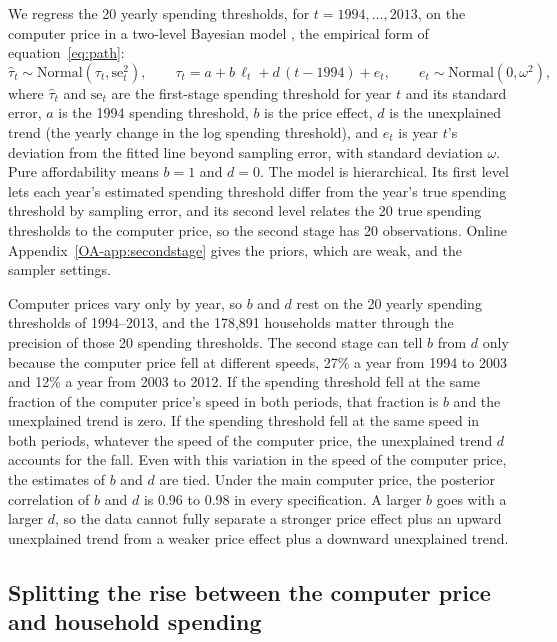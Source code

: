 \documentclass[11pt]{article}
\begin{document}
We regress the 20 yearly spending thresholds, for $t = 1994, \dots, 2013$, on the computer price in a two-level Bayesian model \citep{lewis2005}, the empirical form of equation~\eqref{eq:path}:
\begin{equation}
\hat\tau_t \sim \text{Normal}(\tau_t, \text{se}_t^2), \qquad
\tau_t = a + b\,\ell_t + d\,(t - 1994) + e_t, \qquad e_t \sim \text{Normal}(0, \omega^2),
\end{equation}
where $\hat\tau_t$ and $\text{se}_t$ are the first-stage spending threshold for year $t$ and its standard error, $a$ is the 1994 spending threshold, $b$ is the price effect, $d$ is the unexplained trend (the yearly change in the log spending threshold), and $e_t$ is year $t$'s deviation from the fitted line beyond sampling error, with standard deviation $\omega$. Pure affordability means $b = 1$ and $d = 0$. The model is hierarchical. Its first level lets each year's estimated spending threshold differ from the year's true spending threshold by sampling error, and its second level relates the 20 true spending thresholds to the computer price, so the second stage has 20 observations. Online Appendix~\ref{OA-app:secondstage} gives the priors, which are weak, and the sampler settings.

Computer prices vary only by year, so $b$ and $d$ rest on the 20 yearly spending thresholds of 1994--2013, and the 178{,}891 households matter through the precision of those 20 spending thresholds. The second stage can tell $b$ from $d$ only because the computer price fell at different speeds, 27\% a year from 1994 to 2003 and 12\% a year from 2003 to 2012. If the spending threshold fell at the same fraction of the computer price's speed in both periods, that fraction is $b$ and the unexplained trend is zero. If the spending threshold fell at the same speed in both periods, whatever the speed of the computer price, the unexplained trend $d$ accounts for the fall. Even with this variation in the speed of the computer price, the estimates of $b$ and $d$ are tied. Under the main computer price, the posterior correlation of $b$ and $d$ is 0.96 to 0.98 in every specification. A larger $b$ goes with a larger $d$, so the data cannot fully separate a stronger price effect plus an upward unexplained trend from a weaker price effect plus a downward unexplained trend.

\subsection{Splitting the rise between the computer price and household spending}
\label{sec:splitmethod}
\end{document}
